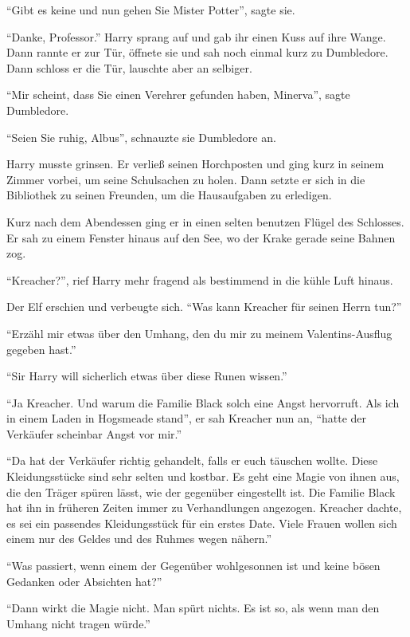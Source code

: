 \enquote{Gibt es keine und nun gehen Sie Mister Potter}, sagte sie.

\enquote{Danke, Professor.} Harry sprang auf und gab ihr einen Kuss auf ihre Wange. Dann rannte er zur Tür, öffnete sie und sah noch einmal kurz zu Dumbledore. Dann schloss er die Tür, lauschte aber an selbiger.

\enquote{Mir scheint, dass Sie einen Verehrer gefunden haben, Minerva}, sagte Dumbledore.

\enquote{Seien Sie ruhig, Albus}, schnauzte sie Dumbledore an.

Harry musste grinsen. Er verließ seinen Horchposten und ging kurz in seinem Zimmer vorbei, um seine Schulsachen zu holen. Dann setzte er sich in die Bibliothek zu seinen Freunden, um die Hausaufgaben zu erledigen.

Kurz nach dem Abendessen ging er in einen selten benutzen Flügel des Schlosses. Er sah zu einem Fenster hinaus auf den See, wo der Krake gerade seine Bahnen zog.

\enquote{Kreacher?}, rief Harry mehr fragend als bestimmend in die kühle Luft hinaus.

Der Elf erschien und verbeugte sich. \enquote{Was kann Kreacher für seinen Herrn tun?}

\enquote{Erzähl mir etwas über den Umhang, den du mir zu meinem Valentins-Ausflug gegeben hast.}

\enquote{Sir Harry will sicherlich etwas über diese Runen wissen.}

\enquote{Ja Kreacher. Und warum die Familie Black solch eine Angst hervorruft. Als ich in einem Laden in Hogsmeade stand}, er sah Kreacher nun an, \enquote{hatte der Verkäufer scheinbar Angst vor mir.}

\enquote{Da hat der Verkäufer richtig gehandelt, falls er euch täuschen wollte. Diese Kleidungsstücke sind sehr selten und kostbar. Es geht eine Magie von ihnen aus, die den Träger spüren lässt, wie der gegenüber eingestellt ist. Die Familie Black hat ihn in früheren Zeiten immer zu Verhandlungen angezogen. Kreacher dachte, es sei ein passendes Kleidungsstück für ein erstes Date. Viele Frauen wollen sich einem nur des Geldes und des Ruhmes wegen nähern.}

\enquote{Was passiert, wenn einem der Gegenüber wohlgesonnen ist und keine bösen Gedanken oder Absichten hat?}

\enquote{Dann wirkt die Magie nicht. Man spürt nichts. Es ist so, als wenn man den Umhang nicht tragen würde.}

